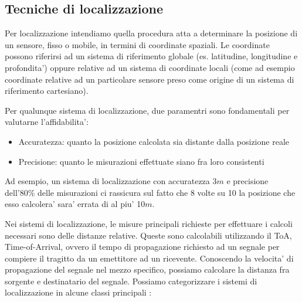 \subsection{Tecniche di localizzazione}
Per localizzazione intendiamo quella procedura atta a determinare la posizione di un sensore, fisso o mobile, in termini di coordinate spaziali. Le coordinate possono riferirsi ad un sistema di riferimento globale (es. latitudine, longitudine e profondita') oppure relative ad un sistema di coordinate locali (come ad esempio coordinate relative ad un particolare sensore preso come origine di un sistema di riferimento cartesiano).
\par
Per qualunque sistema di localizzazione, due paramentri sono fondamentali per valutarne l'affidabilita':
\begin{itemize}
    \item Accuratezza: quanto la posizione calcolata sia distante dalla posizione reale
    \item Precisione: quanto le misurazioni effettuate siano fra loro consistenti
\end{itemize}
Ad esempio, un sistema di localizzazione con accuratezza 3$m$  e precisione dell'80\% delle misurazioni ci rassicura sul fatto che 8 volte su 10 la posizione che esso calcolera' sara' errata di al piu' 10$m$.
\par
Nei sistemi di localizzazione, le misure principali richieste per effettuare i calcoli necessari sono delle distanze relative. Queste sono calcolabili utilizzando il ToA, Time-of-Arrival, ovvero il tempo di propagazione richiesto ad un segnale per compiere il tragitto da un emettitore ad un ricevente. Conoscendo la velocita' di propagazione del segnale nel mezzo specifico, possiamo calcolare la distanza fra sorgente e destinatario del segnale.
Possiamo categorizzare i sistemi di localizzazione in alcune classi principali \cite{trilateration}:
